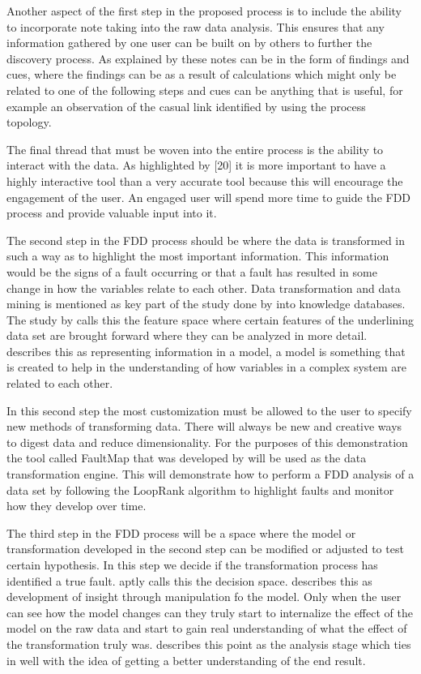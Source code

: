 Another aspect of the first step in the proposed process is to include the ability to incorporate note taking into the raw data analysis. This ensures that any information gathered by one user can be built on by others to further the discovery process. As explained by \cite{mahyar2010closer} these notes can be in the form of findings and cues, where the findings can be as a result of calculations which might only be related to one of the following steps and cues can be anything that is useful, for example an observation of the casual link identified by using the process topology.

The final thread that must be woven into the entire process is the ability to interact with the data. As highlighted by [20] it is more important to have a highly interactive tool than a very accurate tool because this will encourage the engagement of the user. An engaged user will spend more time to guide the FDD process and provide valuable input into it.

The second step in the FDD process should be where the data is transformed in such a way as to highlight the most important information. This information would be the signs of a fault occurring or that a fault has resulted in some change in how the variables relate to each other. Data transformation and data mining is mentioned as key part of the study done by \cite{fayyad1996data} into knowledge databases. The study by \cite{venkatasubramanian2003review} calls this the feature space where certain features of the underlining data set are brought forward where they can be analyzed in more detail. \cite{pirolli2005sensemaking} describes this as representing information in a model, a model is something that is created to help in the understanding of how variables in a complex system are related to each other.

In this second step the most customization must be allowed to the user to specify new methods of transforming data. There will always be new and creative ways to digest data and reduce dimensionality. For the purposes of this demonstration the tool called FaultMap that was developed by \cite{streicher2019plant} will be used as the data transformation engine. This will demonstrate how to perform a FDD analysis of a data set by following the LoopRank algorithm to highlight faults and monitor how they develop over time.

The third step in the FDD process will be a space where the model or transformation developed in the second step can be modified or adjusted to test certain hypothesis. In this step we decide if the transformation process has identified a true fault. \cite{venkatasubramanian2003review} aptly calls this the decision space. \cite{pirolli2005sensemaking} describes this as development of insight through manipulation fo the model. Only when the user can see how the model changes can they truly start to internalize the effect of the model on the raw data and start to gain real understanding of what the effect of the transformation truly was. \cite{mahyar2010closer} describes this point as the analysis stage which ties in well with the idea of getting a better understanding of the end result.

